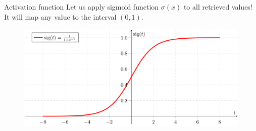 \documentclass{beamer}
\begin{document}
    \begin{frame}{Activation function}
        Let us apply sigmoid function $\sigma(x)$ to all retrieved values! It will map any value to the interval $(0,1)$.
        \begin{figure}
        \centering
            \includegraphics[width=\textwidth]{images/presentation/sigmoid.png}
        \end{figure}
    \end{frame}
\end{document}
